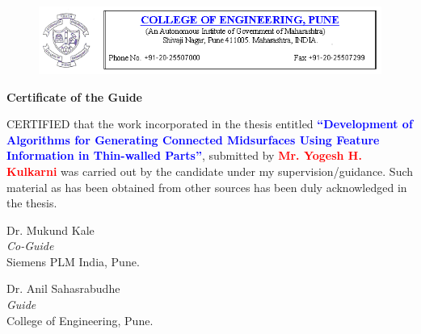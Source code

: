\begin{figure} [!h]
	\centering
	\includegraphics[width=\linewidth]{images/coep_header.png}
\end{figure}

\vspace*{50pt}

\begin{center}{\Huge \textbf{Certificate of the Guide}}\end{center}

\vspace*{20pt}

\begin{flushleft}
CERTIFIED that the work incorporated in the thesis entitled  \textcolor{blue}{\textbf{``Development of Algorithms for Generating Connected Midsurfaces Using Feature Information in Thin-walled Parts''}}, submitted by \textcolor{red}{\textbf{Mr. Yogesh H. Kulkarni}} was carried out by the candidate under my supervision/guidance. Such material as has been obtained from other sources has been duly acknowledged in the thesis. 
\end{flushleft}

\vspace*{120pt}


\begin{minipage}[t]{0.5\textwidth}%
\begin{flushleft}
 Dr. Mukund Kale\\
\emph{Co-Guide}\\
Siemens PLM India, Pune.
\end{flushleft}
\end{minipage}\hspace{0.5cm}
\begin{minipage}[t]{0.4\textwidth}%
\begin{flushleft}
 {
Dr. Anil Sahasrabudhe \\
\emph{Guide}}\\
College of Engineering, Pune.
\end{flushleft}
\end{minipage}
%
%
%


